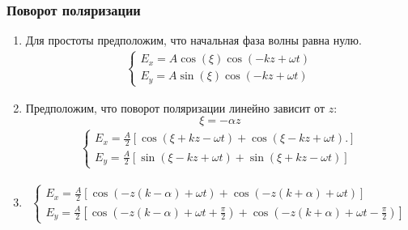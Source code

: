 \documentclass[10pt,pdf,hyperref={unicode}, dvipsnames]{beamer}
\begin{document}
\begin{frame}

	\frametitle{Поворот поляризации}
	\begin{enumerate} 
		\item
		      Для простоты предположим, что начальная фаза волны равна нулю.
		      \begin{gather*}
			      \begin{cases} 
				      E_x = A\cos(\xi)\cos\left(-kz+\omega t\right) \\
				      E_y = A\sin(\xi)\cos\left(-kz+\omega t\right)
			      \end{cases}
		      \end{gather*}
		\item
		      Предположим, что поворот поляризации линейно зависит от $z$:
		      \begin{equation*}
			      \xi=-\alpha z
		      \end{equation*}
		      \begin{gather*}
			      \begin{cases} 
				      E_x = \frac{A}{2}\left[
					      \cos\left(
					      \xi+kz-\omega t
					      \right)+
					      \cos\left(
					      \xi-kz+\omega t
					      \right)
					      .\right] \\
				      E_y = \frac{A}{2}\left[
					      \sin\left(
					      \xi-kz+\omega t
					      \right)+
					      \sin\left(
					      \xi+kz-\omega t
					      \right)
					      \right]
			      \end{cases}
		      \end{gather*}
		\item
		      \begin{gather*}
			      \begin{cases} 
				      E_x = \frac{A}{2}\left[
					      \cos\left(
					      -z(k-\alpha)+\omega t
					      \right)+
					      \cos\left(
					      -z(k+\alpha)+\omega t
					      \right)
					      \right] \\
				      E_y = \frac{A}{2}\left[
					      \cos\left(
					      -z(k-\alpha)+\omega t+\frac{\pi}{2}
					      \right)+
					      \cos\left(
					      -z(k+\alpha)+\omega t-\frac{\pi}{2}
					      \right)
					      \right]
			      \end{cases}
		      \end{gather*}
	\end{enumerate}
\end{frame}
\end{document}
